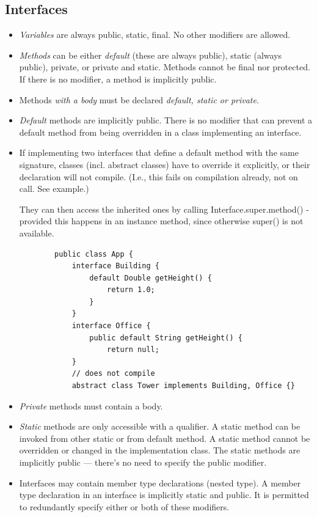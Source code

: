 \documentclass{scrartcl}
\begin{document}
\subsection{Interfaces}
\begin{itemize}

    \item     \textit{Variables} are always public, static, final. No other modifiers are allowed.

    \item     \textit{Methods} can be either \textit{default} (these are always public), static (always public), private, or private and static. Methods cannot be final nor protected. If there is no modifier, a method is implicitly public.

    \item Methods \textit{with a body} must be declared \textit{default, static or private}.

    \item     \textit{Default} methods are implicitly public. There is no modifier that can prevent a default method from being overridden in a class implementing an interface.

    \item     If implementing two interfaces that define a default method with the same signature, classes (incl. abstract classes) have to override it explicitly, or their declaration will not compile. (I.e., this fails on compilation already, not on call. See example.)

    They can then access the inherited ones by calling Interface.super.method() - provided this happens in an instance method, since otherwise super() is not available.

    \begin{lstlisting}
        public class App {
            interface Building {
                default Double getHeight() {
                    return 1.0;
                }
            }
            interface Office {
                public default String getHeight() {
                    return null;
            }
            // does not compile
            abstract class Tower implements Building, Office {}

    \end{lstlisting}

    \item     \textit{Private} methods must contain a body.

    \item     \textit{Static} methods are only accessible with a qualifier. A static method can be invoked from other static or from default method. A static method cannot be overridden or changed in the implementation class. The static methods are implicitly public — there's no need to specify the public modifier.

    \item     Interfaces may contain member type declarations (nested type). A member type declaration in an interface is implicitly static and public. It is permitted to redundantly specify either or both of these modifiers.


\end{itemize}
\end{document}
